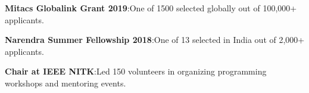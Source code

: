 \documentclass[11pt,a4paper]{article}
\begin{document}

\begin{circlist}
	\item \textbf{Mitacs Globalink Grant 2019}:\hspace{0.5ex}One of 1500 selected globally out of 100,000+ applicants.
	\item \textbf{Narendra Summer Fellowship 2018}:\hspace{0.5ex}One of 13 selected in India out of 2,000+ applicants.
	\item \textbf{Chair at IEEE NITK}:\hspace{0.5ex}Led 150 volunteers in organizing programming workshops and mentoring events.
\end{circlist}
\end{document}
